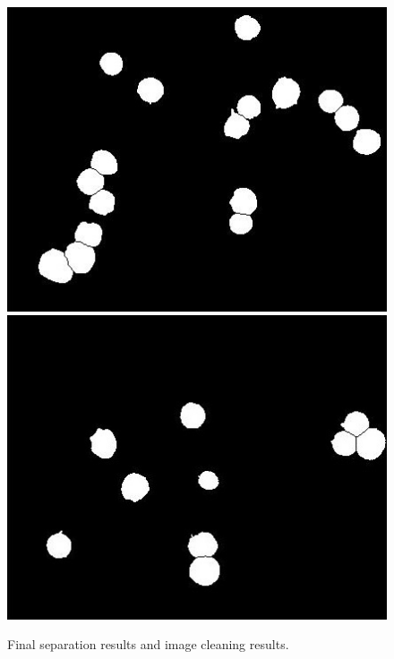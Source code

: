 \documentclass[final,a4paper,12pt,english]{UnicaPhdThesis3}
\begin{document}
{\begin{figure}[!htbp]
\includegraphics[height=0.23\textheight]{images/Fig15-1}
\includegraphics[height=0.23\textheight]{images/Fig15-2}
\caption{\label{fig:example13}Final separation results and image cleaning results.}
\end{figure}

}
\end{document}
